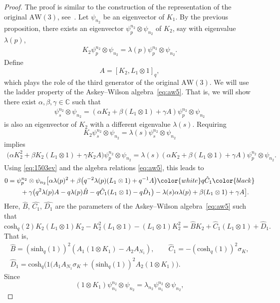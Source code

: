\documentclass[10pt,a4paper]{amsart}
\numberwithin{equation}{section}
\newcommand{\CC}{\mathbb{C}}
\newcommand{\aw}{\mathrm{AW}\!\left(3\right)}
\newcommand{\chq}{\mathrm{cosh}_q}
\newcommand{\psimn}[2]{\psi_{#1}^{#2}\otimes \psi_{#2}}
\newcommand{\shq}{\mathrm{sinh}_q}
\begin{document}
\begin{proof}
	The proof is similar to the construction of the representation of the original $\aw$, see~\cite{Zhedanov1991}. Let $\psi_{n_2}$ be an eigenvector of $K_1$. By the previous proposition, there exists an eigenvector $\psi_{p}^{n_2}\otimes \psi_{n_2}$ of $K_2$, say with eigenvalue $\lambda(p)$,
	\begin{gather}
		K_2 \psimn{p}{n_2} = \lambda(p) \psimn{p}{n_2}.\label{eq:1503ev}
	\end{gather}
	Define
	\[
	A=[K_2,L_1\otimes 1]_q,
	\]
	which plays the role of the third generator of the original $\aw$. We will use the ladder property of the Askey--Wilson algebra~\eqref{eq:aw5}. That is, we will show there exist $\alpha,\beta,\gamma\in\CC$ such that
	\begin{gather*}
		\psimn{s}{n_2} = \left(\alpha K_2 + \beta (L_1\otimes 1) + \gamma A\right)\psimn{p}{n_2}
	\end{gather*}
	is also an eigenvector of $K_2$ with a different eigenvalue $\lambda(s)$. Requiring
	\[K_2\psimn{s}{n_2} = \lambda(s) \psimn{s}{n_2}\]
	implies
	\begin{gather*}
		\big( \alpha K_2^2 + \beta K_2(L_1\otimes 1) + \gamma K_2A\big)\psimn{p}{n_2} = \lambda(s) (\alpha K_2 + \beta (L_1\otimes 1) + \gamma A )\psimn{p}{n_2}.
	\end{gather*}
	Using \eqref{eq:1503ev} and the algebra relations \eqref{eq:aw5}, this leads to
	\begin{gather*}
		0= \psimn{p}{n_2}\big[ \alpha \lambda(p)^2 + \beta \big(q^{-2}\lambda(p)(L_1\otimes 1) + q^{-1}A \big) \color{white}q\hat{C}_1\color{black} \\
\hphantom{0=}{} +\gamma \big(q^2\lambda(p)A - q\lambda(p)\hat{B} - q\hat{C}_1(L_1\otimes 1) - q\hat{D}_1\big) - \lambda(s) \alpha \lambda(p) + \beta (L_1\otimes 1) + \gamma A\big].
	\end{gather*}
	Here, $\hat{B}$, $\hat{C_1}$, $\hat{D_1}$ are the parameters of the Askey--Wilson algebra~\eqref{eq:aw5} such that
	\[
	\chq(2) K_2 (L_1\otimes 1) K_2 - K_2^2 (L_1\otimes 1) - (L_1\otimes 1) K_2^2 = \hat{B}K_2 + \hat{C}_1 (L_1\otimes 1) + \hat{D}_1.
	\]
	That is,
	\begin{gather*}
		\hat{B}=(\shq(1))^2 ( A_1 (1\otimes K_1)- A_2 A_{N_1} ),\qquad \hat{C}_1 = -(\chq(1))^2 \sigma_K,\\
		\hat{D}_1= \chq(1\big(A_1A_{N_1}\sigma_K + (\shq(1))^2A_2 (1\otimes K_1)\big).
	\end{gather*}
	Since
	\[
	(1\otimes K_1) \psi_{n_1}^{n_2}\otimes\psi_{n_2} = \lambda_{n_2} \psi_{n_1}^{n_2}\otimes\psi_{n_2},
\]
\end{proof}
\end{document}
